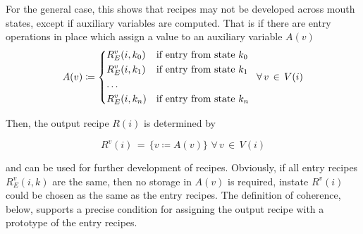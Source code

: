 \documentclass[12pt,a4paper]{scrartcl}
\begin{document}
For the general case, this shows that recipes may not be developed across
mouth states, except if auxiliary variables are computed. That is if there
are entry operations in place which assign a value to an auxiliary variable $A(v)$
\begin{equation}
    A(v) \coloneqq   \begin{dcases*}
             R^v_E(i,k_0) & if entry from state $k_0$ \\
             R^v_E(i,k_1) & if entry from state $k_1$ \\
             \ldots \\
             R^v_E(i,k_n) & if entry from state $k_n$ \\
            \end{dcases*}
            \,\forall\,v\,\in\,V(i)
\end{equation}

Then, the output recipe $R(i)$ is determined by

\begin{equation}
    R^v(i) \,=\, \{ v \coloneqq A(v) \}\,\,\forall\,v\,\in\,V(i)
\end{equation}

and can be used for further development of recipes. Obviously, if all entry 
recipes $R^v_E(i,k)$ are the same, then no storage in $A(v)$ is required, instate
$R^v(i)$ could be chosen as the same as the entry recipes. The definition
of coherence, below, supports a precise condition for assigning the output
recipe with a prototype of the entry recipes.
\end{document}
